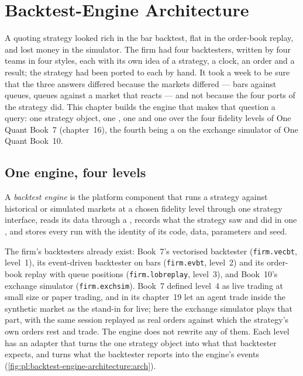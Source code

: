 \chapter{Backtest-Engine Architecture}\label{ch:pl:backtest-engine-architecture}

A quoting strategy looked rich in the bar backtest, flat in the order-book replay, and lost money in the simulator. The firm had
four backtesters, written by four teams in four styles, each with its own idea of a strategy, a clock, an order and a result; the
strategy had been ported to each by hand. It took a week to be sure that the three answers differed because the markets differed
--- bars against queues, queues against a market that reacts --- and not because the four ports of the strategy did. This chapter
builds the engine that makes that question a query: one strategy object, one , one  and one  over the four fidelity levels of One Quant Book~7 (chapter~16), the fourth being a  on the exchange simulator
of One Quant Book~10.

\section{One engine, four levels}

\begin{definition}\label{def:pl:backtest-engine-architecture:engine}
A \emph{backtest engine} is the platform component that runs a strategy against historical or simulated
markets at a chosen fidelity level through one strategy interface, reads its data through a , records what the
strategy saw and did in one , and stores every run with the identity of its code, data, parameters and seed.
\end{definition}

The firm's backtesters already exist: Book~7's vectorised backtester (\texttt{firm.vecbt}, level~1), its event-driven backtester on
bars (\texttt{firm.evbt}, level~2) and its order-book replay with queue positions (\texttt{firm.lobreplay}, level~3), and Book~10's
exchange simulator (\texttt{firm.exchsim}). Book~7 defined level~4 as live trading at small size or paper trading, and in its
chapter~19 let an agent trade inside the synthetic market as the stand-in for live; here the exchange simulator plays that part, with
the same session replayed as real orders against which the strategy's own orders rest and trade. The engine does not rewrite any of
them. Each level has an adapter that turns the one strategy object into what that backtester expects, and turns what the backtester
reports into the engine's events (\cref{fig:pl:backtest-engine-architecture:arch}).

